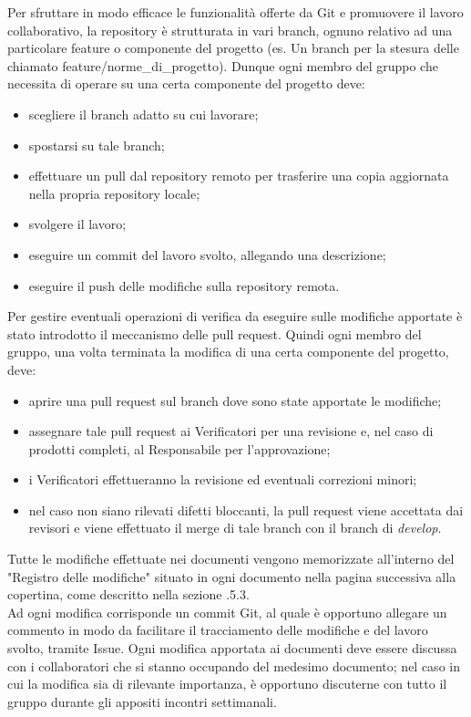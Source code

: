        Per sfruttare in modo efficace le funzionalità offerte da Git e promuovere il lavoro collaborativo, la repository è strutturata in vari branch, ognuno relativo ad una particolare feature o componente del progetto (es. Un branch per la stesura delle \NdP{} chiamato feature/norme\_di\_progetto). Dunque ogni membro del gruppo che necessita di operare su una certa componente del progetto deve:
        \begin{itemize}
          \item scegliere il branch adatto su cui lavorare;
          \item spostarsi su tale branch;
          \item effettuare un pull dal repository remoto per trasferire una copia aggiornata nella propria repository locale;
          \item svolgere il lavoro;
          \item eseguire un commit del lavoro svolto, allegando una descrizione;
          \item eseguire il push delle modifiche sulla repository remota.
        \end{itemize}
    	Per gestire eventuali operazioni di verifica da eseguire sulle modifiche apportate è stato introdotto il meccanismo delle pull request. Quindi ogni membro del gruppo, una volta terminata la modifica di una certa componente del progetto, deve:
    	\begin{itemize}
    		\item aprire una pull request sul branch dove sono state apportate le modifiche;
    		\item assegnare tale pull request ai Verificatori per una revisione e, nel caso di prodotti completi, al Responsabile per l'approvazione;
    		\item i Verificatori effettueranno la revisione ed eventuali correzioni minori;
    		\item nel caso non siano rilevati difetti bloccanti, la pull request viene accettata dai revisori e viene effettuato il merge di tale branch con il branch di \textit{develop}.
    	\end{itemize}

        Tutte le modifiche effettuate nei documenti vengono memorizzate all'interno del "Registro delle modifiche" situato in ogni documento nella pagina successiva alla copertina, come descritto nella sezione .5.3.\\
        Ad ogni modifica corrisponde un commit Git, al quale è opportuno allegare un commento in modo da facilitare il tracciamento delle modifiche e del lavoro svolto, tramite Issue.
        Ogni modifica apportata ai documenti deve essere discussa con i collaboratori che si stanno occupando del medesimo documento; nel caso in cui la modifica sia di rilevante importanza, è opportuno discuterne con tutto il gruppo durante gli appositi incontri settimanali.
